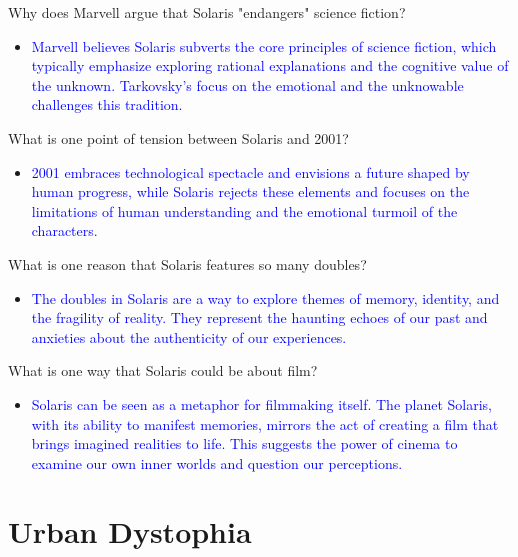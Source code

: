 \documentclass[11pt,fleqn]{book}
\begin{document}
\begin{exercise}
Why does Marvell argue that Solaris "endangers" science fiction?
\begin{itemize}
\item \textcolor{blue}{Marvell believes Solaris subverts the core principles of science fiction, which typically emphasize exploring rational explanations and the cognitive value of the unknown. Tarkovsky's focus on the emotional and the unknowable challenges this tradition.}
\end{itemize}
\end{exercise}

\begin{exercise}
What is one point of tension between Solaris and 2001?
\begin{itemize}
\item \textcolor{blue}{2001 embraces technological spectacle and envisions a future shaped by human progress, while Solaris  rejects these elements and focuses on the limitations of human understanding and the emotional turmoil of the characters. }
\end{itemize}
\end{exercise}

\begin{exercise}
What is one reason that Solaris features so many doubles?
\begin{itemize}
    \item \textcolor{blue}{The doubles in Solaris are a way to explore themes of memory, identity, and the fragility of reality. They represent the haunting echoes of our past and anxieties about the authenticity of our experiences.}
\end{itemize}
\end{exercise}

\begin{exercise}
What is one way that Solaris could be about film?
\begin{itemize}
    \item \textcolor{blue}{Solaris can be seen as a metaphor for filmmaking itself. The planet Solaris, with its ability to manifest memories, mirrors the act of creating a film that brings imagined realities to life. This suggests the power of cinema to examine our own inner worlds and question our perceptions.}
\end{itemize}
\end{exercise}




\section{Urban Dystophia}
\end{document}
